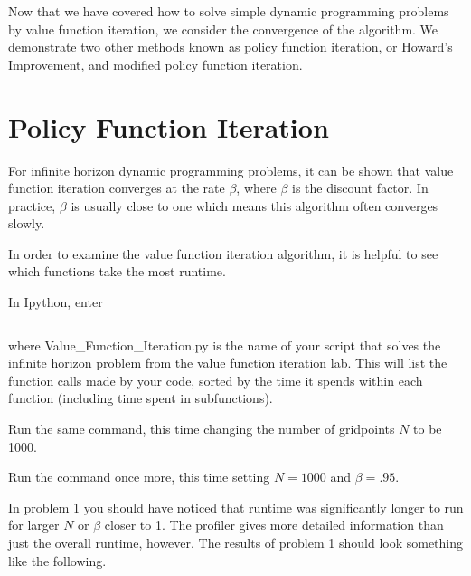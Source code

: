 

Now that we have covered how to solve simple dynamic programming problems by value function iteration, we consider the convergence of the algorithm.  We demonstrate two other methods known as policy function iteration, or Howard's Improvement, and modified policy function iteration.

\section*{Policy Function Iteration}
For infinite horizon dynamic programming problems, it can be shown that value function iteration converges at the rate $\beta$, where $\beta$ is the discount factor.  In practice, $\beta$ is usually close to one which means this algorithm often converges slowly.

In order to examine the value function iteration algorithm, it is helpful to see which functions take the most runtime.

\begin{problem}
In Ipython, enter
\begin{lstlisting}[style=python]
%run -p -s cum Value_Function_Iteration.py
\end{lstlisting}
where Value\_Function\_Iteration.py is the name of your script that solves the infinite horizon problem from the value function iteration lab.  This will list the function calls made by your code, sorted by the time it spends within each function (including time spent in subfunctions).

Run the same command, this time changing the number of gridpoints $N$ to be 1000.

Run the command once more, this time setting $N=1000$ and $\beta = .95$.
\end{problem}

In problem 1 you should have noticed that runtime was significantly longer to run for larger $N$ or $\beta$ closer to 1.  The profiler gives more detailed information than just the overall runtime, however.  The results of problem 1 should look something like the following.


